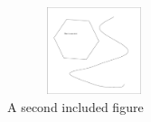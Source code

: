 \documentclass[dvipdfm]{article}
\begin{document}
\begin{figure}
  \begin{center}
    \includegraphics[clip,angle=20,height=1.0in,width=2.0in]{something.eps}
  \end{center}

  \caption{A second included figure}
  \label{fig:something}
\end{figure}
\end{document}
